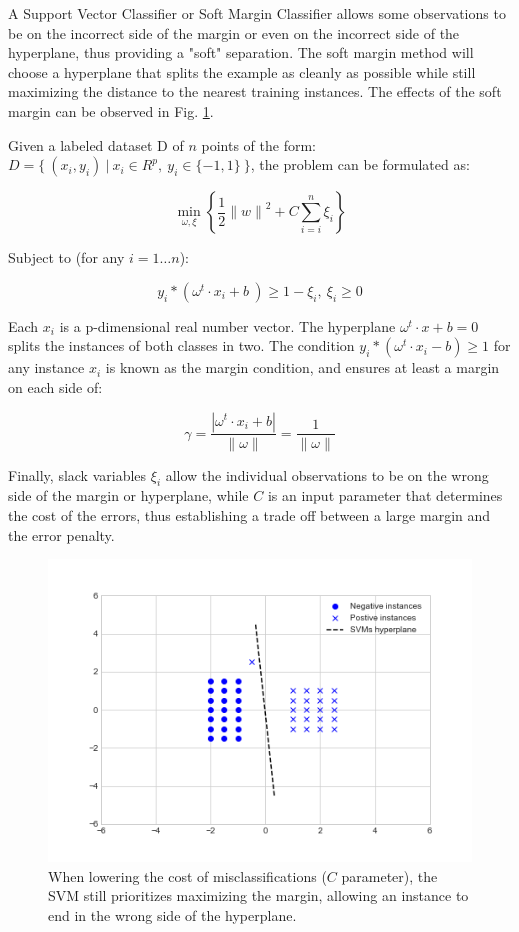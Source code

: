 A Support Vector Classifier or Soft Margin Classifier allows some observations to be on the
incorrect side of the margin or even on the incorrect side of the hyperplane, thus providing
a "soft" separation. The soft margin method will choose a hyperplane that splits the example
as cleanly as possible while still maximizing the distance to the nearest training instances.
The effects of the soft margin can be observed in Fig. \ref{fig:soft_margin_low_c}.

Given a labeled dataset D of $n$ points
of the form: $D=\{ \ (x_{i}, y_{i}) \ | \ x_{i} \in R^{p}, \ y_{i} \in \{-1, 1\} \ \}$, the
problem can be formulated as:

\begin{equation}
  \displaystyle \min_{\omega, \xi} \left\{ \frac{1}{2}{\| w \|}^{2} + C \sum_{i=i}^{n}\xi_{i} \right\}
\end{equation}

Subject to (for any $i = 1 \ldots n$):

\begin{equation}
  y_{i}*(\omega^{t} \cdot x_{i} + b \ ) \geq 1 - \xi_{i}, \ \xi_{i} \geq 0
\end{equation}

Each $x_{i}$ is a p-dimensional real number vector.
The hyperplane $\omega^{t} \cdot x + b = 0$ splits the instances of both classes in two.
The condition $y_{i}*(\omega^{t} \cdot x_{i} - b) \geq 1$ for any instance $x_{i}$ is
known as the margin condition, and ensures at least a margin on each side of:

\begin{equation}
  \gamma = \frac{ |\omega^{t} \cdot x_{i} + b| }{ \| \omega \| } = \frac{1}{\| \omega \|}
\end{equation}

Finally, slack variables $\xi_{i}$ allow the individual observations to be
on the wrong side of the
margin or hyperplane, while $C$ is an input parameter that determines the cost of
the errors, thus establishing a trade off between a large margin and the error penalty.

\begin{figure}[H]
  \centering
  \includegraphics[width=.55\linewidth]{files/figures/method/soft_margin_low_c}
  \caption{When lowering the cost of misclassifications ($C$ parameter), the SVM still
  prioritizes maximizing the margin, allowing an instance to end in the wrong side
  of the hyperplane.}
  \label{fig:soft_margin_low_c}
\end{figure}

